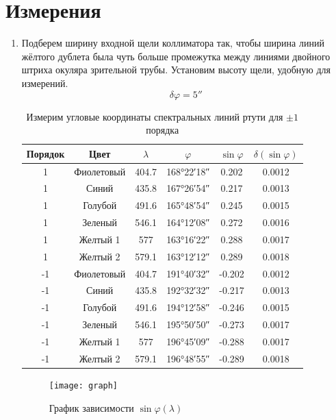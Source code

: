 \documentclass{letask}
\begin{document}
\section{Измерения}
\begin{enumerate}
  \item Подберем ширину входной щели коллиматора так, чтобы ширина линий жёлтого дублета была чуть больше промежутка между линиями двойного штриха окуляра зрительной трубы. Установим высоту щели, удобную для измерений.
\[\delta \varphi = \ang{;;5}\]
\begin{table}[H]
\centering
\caption{Измерим угловые координаты спектральных линий ртути для $\pm 1$ порядка}
\begin{tabular}{|c|c|c|c|c|c|}
\hline
Порядок & Цвет & $\lambda$   & $\varphi$   & $\sin \varphi $  & $\delta (\sin \varphi)$\\ \hline
1       & Фиолетовый & 404.7 & \ang{168;22;18} & 0.202  & 0.0012 \\ \hline
1       & Синий      & 435.8 & \ang{167;26;54} & 0.217  & 0.0013 \\ \hline
1       & Голубой    & 491.6 & \ang{165;48;54} & 0.245  & 0.0015 \\ \hline
1       & Зеленый    & 546.1 & \ang{164;12;08} & 0.272  & 0.0016 \\ \hline
1       & Желтый 1   & 577   & \ang{163;16;22} & 0.288  & 0.0017 \\ \hline
1       & Желтый 2   & 579.1 & \ang{163;12;12} & 0.289  & 0.0018 \\ \hline
-1      & Фиолетовый & 404.7 & \ang{191;40;32} & -0.202 & 0.0012 \\ \hline
-1      & Синий      & 435.8 & \ang{192;32;32} & -0.217 & 0.0013 \\ \hline
-1      & Голубой    & 491.6 & \ang{194;12;58} & -0.246 & 0.0015 \\ \hline
-1      & Зеленый    & 546.1 & \ang{195;50;50} & -0.273 & 0.0017 \\ \hline
-1      & Желтый 1   & 577   & \ang{196;45;09} & -0.288 & 0.0017 \\ \hline
-1      & Желтый 2   & 579.1 & \ang{196;48;55} & -0.289 & 0.0018 \\ \hline
\end{tabular}
\end{table}

\begin{figure}[H]
\centering
	\texttt{[image: graph]}
	\caption{График зависимости $\sin \varphi (\lambda)$}
	\label{fig:graph}
\end{figure}


\end{enumerate}
\end{document}
